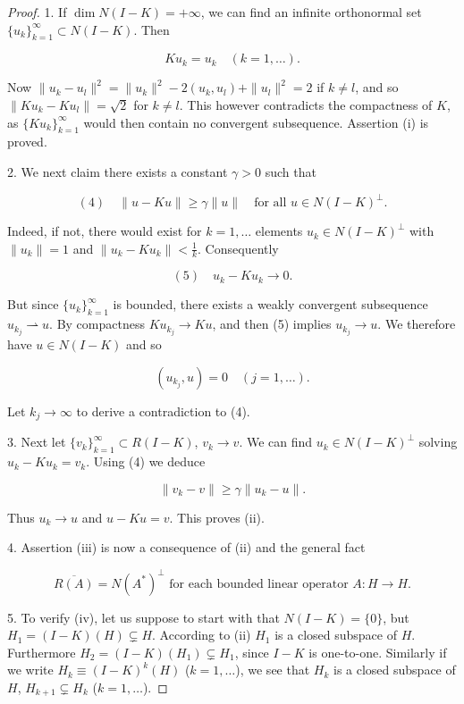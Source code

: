 \begin{proof}
1. If $\dim N(I - K) = +\infty$, we can find an infinite orthonormal set $\{u_k\}_{k=1}^\infty \subset N(I - K)$. Then

$$Ku_k = u_k \quad (k = 1, \ldots).$$

Now $\|u_k - u_l\|^2 = \|u_k\|^2 - 2(u_k, u_l) + \|u_l\|^2 = 2$ if $k \neq l$, and so $\|Ku_k - Ku_l\| = \sqrt{2}$ for $k \neq l$. This however contradicts the compactness of $K$, as $\{Ku_k\}_{k=1}^\infty$ would then contain no convergent subsequence. Assertion (i) is proved.

2. We next claim there exists a constant $\gamma > 0$ such that

$$(4) \quad \|u - Ku\| \geq \gamma\|u\| \quad \text{for all } u \in N(I - K)^\perp.$$

Indeed, if not, there would exist for $k = 1, \ldots$ elements $u_k \in N(I - K)^\perp$ with $\|u_k\| = 1$ and $\|u_k - Ku_k\| < \frac{1}{k}$. Consequently

$$(5) \quad u_k - Ku_k \to 0.$$

But since $\{u_k\}_{k=1}^\infty$ is bounded, there exists a weakly convergent subsequence $u_{k_j} \rightharpoonup u$. By compactness $Ku_{k_j} \to Ku$, and then (5) implies $u_{k_j} \to u$. We therefore have $u \in N(I - K)$ and so

$$(u_{k_j}, u) = 0 \quad (j = 1, \ldots).$$

Let $k_j \to \infty$ to derive a contradiction to (4).

3. Next let $\{v_k\}_{k=1}^\infty \subset R(I - K)$, $v_k \to v$. We can find $u_k \in N(I - K)^\perp$ solving $u_k - Ku_k = v_k$. Using (4) we deduce

$$\|v_k - v\| \geq \gamma\|u_k - u\|.$$

Thus $u_k \to u$ and $u - Ku = v$. This proves (ii).

4. Assertion (iii) is now a consequence of (ii) and the general fact

$$\overline{R(A)} = N(A^*)^\perp \text{ for each bounded linear operator } A : H \to H.$$

5. To verify (iv), let us suppose to start with that $N(I - K) = \{0\}$, but $H_1 = (I - K)(H) \subsetneq H$. According to (ii) $H_1$ is a closed subspace of $H$. Furthermore $H_2 = (I - K)(H_1) \subsetneq H_1$, since $I - K$ is one-to-one. Similarly if we write $H_k \equiv (I - K)^k(H)$ ($k = 1, \ldots$), we see that $H_k$ is a closed subspace of $H$, $H_{k+1} \subsetneq H_k$ ($k = 1, \ldots$).


\end{proof}

